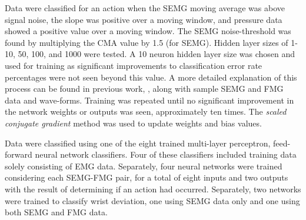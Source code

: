 \documentclass[twocolumn]{sagej}
\begin{document}
Data were classified for an action when the SEMG moving average was above signal noise, the slope was positive over a moving window, and pressure data showed a positive value over a moving window. The SEMG noise-threshold was found by multiplying the CMA value by 1.5 (for SEMG). Hidden layer sizes of 1-10, 50, 100, and 1000 were tested. A 10 neuron hidden layer size was chosen and used for training as significant improvements to classification error rate percentages were not seen beyond this value. A more detailed explanation of this process can be found in previous work, \cite{SanfordSPIE2015a}, along with sample SEMG and FMG data and wave-forms.  Training was repeated until no significant improvement in the network weights or outputs was seen, approximately ten times.  The \textit{scaled conjugate gradient} method was used to update weights and bias values\cite{Moller1993}. \par \noindent%
Data were classified using one of the eight trained multi-layer perceptron, feed-forward neural network classifiers.  Four of these classifiers included training data solely consisting of EMG data.  Separately, four neural networks were trained considering each SEMG-FMG pair, for a total of eight inputs and two outputs with the result of determining if an action had occurred.  Separately, two networks were trained to classify wrist deviation, one using SEMG data only and one using both SEMG and FMG data.\par \noindent
\end{document}
